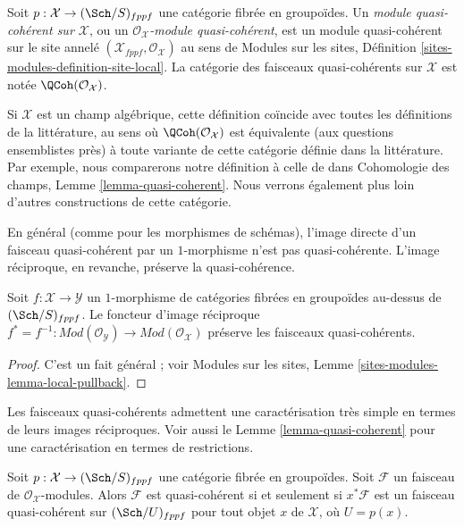 \begin{definition}
\label{definition-quasi-coherent}
Soit $p : \mathcal{X} \to (\Sch/S)_{fppf}$ une catégorie fibrée
en groupoïdes. Un {\it module quasi-cohérent sur $\mathcal{X}$}, ou un
{\it $\mathcal{O}_\mathcal{X}$-module quasi-cohérent}, est un
module quasi-cohérent sur le site annelé
$(\mathcal{X}_{fppf}, \mathcal{O}_\mathcal{X})$ au sens de
Modules sur les sites, Définition \ref{sites-modules-definition-site-local}.
La catégorie des faisceaux quasi-cohérents sur $\mathcal{X}$
est notée $\QCoh(\mathcal{O}_\mathcal{X})$.
\end{definition}

\noindent
Si $\mathcal{X}$ est un champ algébrique, cette définition coïncide avec toutes les
définitions de la littérature, au sens où $\QCoh(\mathcal{O}_\mathcal{X})$
est équivalente (aux questions ensemblistes près) à toute variante de cette catégorie
définie dans la littérature. Par exemple, nous comparerons notre définition à
celle de \cite[définition 6.1]{olsson_sheaves} dans
Cohomologie des champs, Lemme \ref{lemma-quasi-coherent}.
Nous verrons également plus loin d'autres constructions de cette catégorie.

\medskip\noindent
En général (comme pour les morphismes de schémas), l'image directe
d'un faisceau quasi-cohérent par un $1$-morphisme n'est pas quasi-cohérente.
L'image réciproque, en revanche, préserve la quasi-cohérence.

\begin{lemma}
\label{lemma-pullback-quasi-coherent}
Soit $f : \mathcal{X} \to \mathcal{Y}$ un $1$-morphisme de catégories
fibrées en groupoïdes au-dessus de $(\Sch/S)_{fppf}$.
Le foncteur d'image réciproque
$f^* = f^{-1} : \textit{Mod}(\mathcal{O}_\mathcal{Y}) \to
\textit{Mod}(\mathcal{O}_\mathcal{X})$
préserve les faisceaux quasi-cohérents.
\end{lemma}

\begin{proof}
C'est un fait général ; voir
Modules sur les sites, Lemme \ref{sites-modules-lemma-local-pullback}.
\end{proof}

\noindent
Les faisceaux quasi-cohérents admettent une caractérisation très simple
en termes de leurs images réciproques. Voir aussi le
Lemme \ref{lemma-quasi-coherent}
pour une caractérisation en termes de restrictions.

\begin{lemma}
\label{lemma-characterize-quasi-coherent}
Soit $p : \mathcal{X} \to (\Sch/S)_{fppf}$ une catégorie
fibrée en groupoïdes. Soit $\mathcal{F}$
un faisceau de $\mathcal{O}_\mathcal{X}$-modules. Alors $\mathcal{F}$
est quasi-cohérent si et seulement si $x^*\mathcal{F}$ est un faisceau
quasi-cohérent sur $(\Sch/U)_{fppf}$ pour tout objet $x$ de
$\mathcal{X}$, où $U = p(x)$.
\end{lemma}

